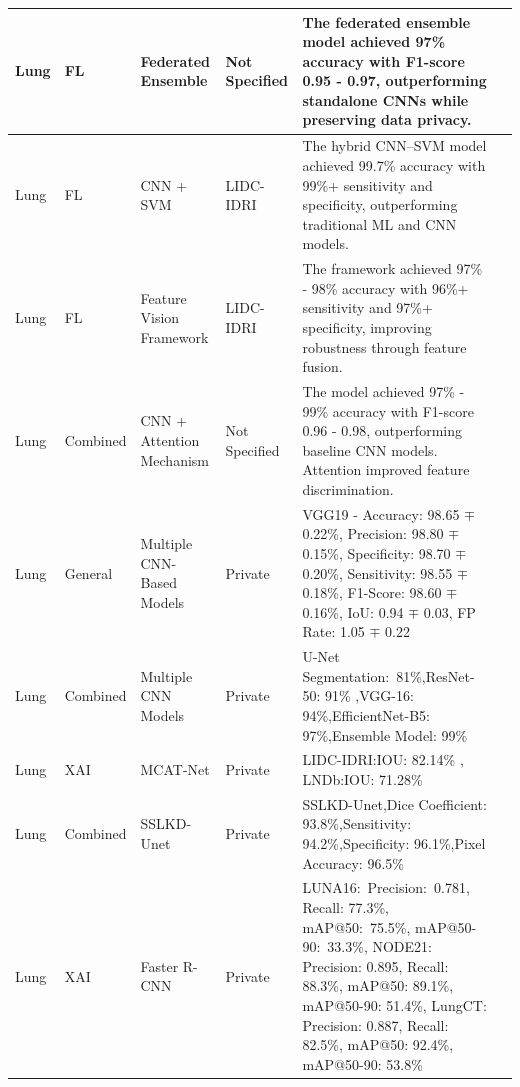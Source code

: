 \begin{center}
\begin{longtable}{|p{1cm}|p{1.5cm}|p{2cm}|p{1.8cm}|p{5cm}|p{1.2cm}|}
		Lung & FL & Federated Ensemble & Not Specified & The federated ensemble model achieved 97\% accuracy with F1-score 0.95 - 0.97, outperforming standalone CNNs while preserving data privacy.
		& \cite{umam2023} \\
		\hline
		
		Lung & FL & CNN + SVM & LIDC-IDRI & The hybrid CNN–SVM model achieved 99.7\% accuracy with 99\%+ sensitivity and specificity, outperforming traditional ML and CNN models.
		& \cite{BEHURIA2025279} \\
		\hline
		
		Lung & FL & Feature Vision Framework & LIDC-IDRI & The framework achieved 97\% - 98\% accuracy with 96\%+ sensitivity and 97\%+ specificity, improving robustness through feature fusion.
		& \cite{HEIDARI2023102572} \\
		\hline
		
		Lung & Combined & CNN + Attention Mechanism & Not Specified & The model achieved 97\% - 99\% accuracy with F1-score 0.96 - 0.98, outperforming baseline CNN models. Attention improved feature discrimination.
		& \cite{SIAM2026108719} \\
		\hline
		
		Lung & General & Multiple CNN-Based Models & Private & VGG19 - Accuracy: 98.65 $\mp$ 0.22\%, Precision: 98.80 $\mp$ 0.15\%, Specificity: 98.70 $\mp$ 0.20\%, Sensitivity: 98.55 $\mp$ 0.18\%, F1-Score: 98.60 $\mp$ 0.16\%, IoU: 0.94 $\mp$ 0.03, FP Rate: 1.05 $\mp$ 0.22
		& \cite{article3} \\
		\hline
		
		Lung & Combined & Multiple CNN Models & Private & U-Net Segmentation: 81\%,ResNet-50: 91\% ,VGG-16: 94\%,EfficientNet-B5: 97\%,Ensemble Model: 99\%
		& \cite{KANAKARADDI20243226} \\
		\hline
		
		Lung & XAI & MCAT-Net & Private & LIDC-IDRI:IOU: 82.14\% , LNDb:IOU: 71.28\%
		& \cite{tian2024} \\
		\hline
		
		Lung & Combined & SSLKD-Unet & Private & SSLKD-Unet,Dice Coefficient: 93.8\%,Sensitivity: 94.2\%,Specificity: 96.1\%,Pixel Accuracy: 96.5\%
		& \cite{wenjuan2025} \\
		\hline
		
		Lung & XAI & Faster R-CNN & Private & LUNA16: Precision: 0.781, Recall: 77.3\%, mAP@50: 75.5\%, mAP@50-90: 33.3\%, NODE21: Precision: 0.895, Recall: 88.3\%, mAP@50: 89.1\%, mAP@50-90: 51.4\%, LungCT: Precision: 0.887, Recall: 82.5\%, mAP@50: 92.4\%, mAP@50-90: 53.8\%
		& \cite{s25144245} \\
		\hline
		

\end{longtable}
\end{center}

